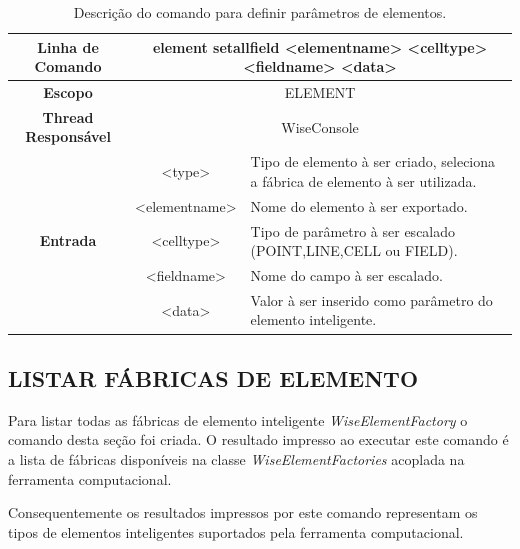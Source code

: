 \begin{center}
	\begin{table}[!htbp]
		\begin{tabular}{|c|c|m{}|}
			\hline
			\textbf{Linha de Comando} & \multicolumn{2}{c|}{element set\underline{\space\space}all\underline{\space\space}field <element\underline{\space\space}name> <cell\underline{\space\space}type> <field\underline{\space\space}name> <data>} \\
			\hline
			\textbf{Escopo} & \multicolumn{2}{c|}{ELEMENT} \\
			\hline
			\textbf{Thread Responsável} & \multicolumn{2}{c|}{WiseConsole} \\
			\hline
			\multirow{5}{*}{\textbf{Entrada}} & <type> & Tipo de elemento à ser criado, seleciona a fábrica de elemento à ser utilizada. \\
			
			& <element\underline{\space\space}name> & Nome do elemento à ser exportado. \\
			& <cell\underline{\space\space}type> & Tipo de parâmetro à ser escalado (POINT,LINE,CELL ou FIELD). \\
			& <field\underline{\space\space}name> & Nome do campo à ser escalado. \\
			& <data> & Valor à ser inserido como parâmetro do elemento inteligente. \\
			\hline
		\end{tabular}
		\caption{Descrição do comando para definir parâmetros de elementos.}
		\label{tab:set_all_field_element}
	\end{table}
\end{center}

\subsection{LISTAR FÁBRICAS DE ELEMENTO}\label{sec:list_element_factories}

Para listar todas as fábricas de elemento inteligente \textit{WiseElementFactory} o comando desta seção foi criada. O resultado impresso ao executar este comando é a lista de fábricas disponíveis na classe \textit{WiseElementFactories} acoplada na ferramenta computacional.

Consequentemente os resultados impressos por este comando representam os tipos de elementos inteligentes suportados pela ferramenta computacional.

